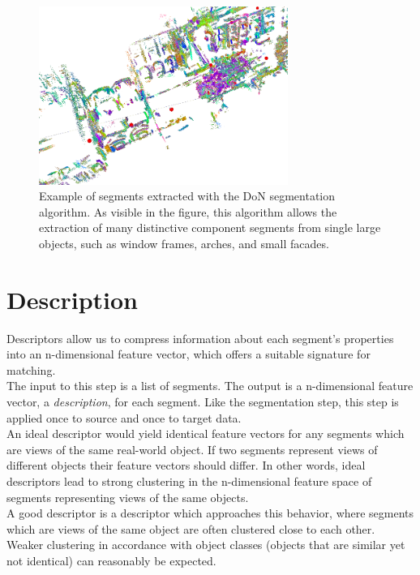 \begin{figure}
  \centering
  \includegraphics[width=3.2in]{images/don_segments.png}
  \caption{Example of segments extracted with the DoN segmentation algorithm. As visible in the figure, this algorithm allows the extraction of many distinctive component segments from single large objects, such as window frames, arches, and small facades.}
  \label{fig:don-segments}
\end{figure}

\section{Description}
\label{sec:description}

Descriptors allow us to compress information about each segment's properties into an n-dimensional feature vector, which offers a suitable signature for matching.\\

The input to this step is a list of segments. The output is a n-dimensional feature vector, a \textit{description}, for each segment. Like the segmentation step, this step is applied once to source and once to target data.\\

An ideal descriptor would yield identical feature vectors for any segments which are views of the same real-world object. If two segments represent views of different objects their feature vectors should differ.  
In other words, ideal descriptors lead to strong clustering in the n-dimensional feature space of segments representing views of the same objects. \\

A good descriptor is a descriptor which approaches this behavior, where segments which are views of the same object are often clustered close to each other. Weaker clustering in accordance with object classes (objects that are similar yet not identical) can reasonably be expected.\\

